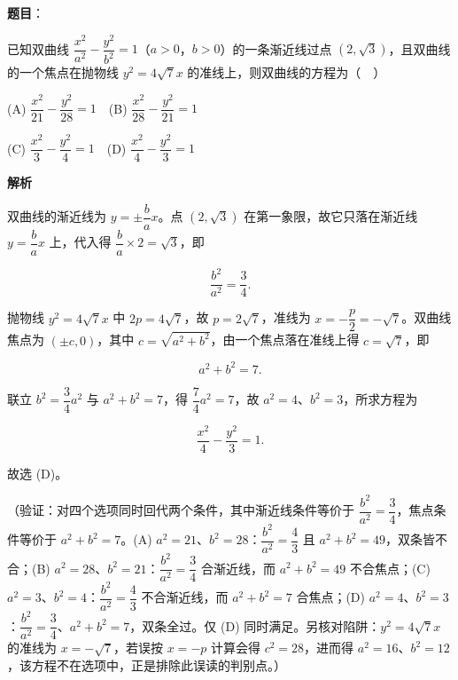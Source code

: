 \begin{answer}

\textbf{题目}：

已知双曲线 \(\dfrac{x^2}{a^2}-\dfrac{y^2}{b^2}=1\)（\(a>0\)，\(b>0\)）的一条渐近线过点 \((2,\sqrt{3})\)，且双曲线的一个焦点在抛物线 \(y^2=4\sqrt{7}x\) 的准线上，则双曲线的方程为（　）

(A) \(\dfrac{x^2}{21}-\dfrac{y^2}{28}=1\)　(B) \(\dfrac{x^2}{28}-\dfrac{y^2}{21}=1\)

(C) \(\dfrac{x^2}{3}-\dfrac{y^2}{4}=1\)　(D) \(\dfrac{x^2}{4}-\dfrac{y^2}{3}=1\)

\textbf{解析}

双曲线的渐近线为 \(y=\pm\dfrac{b}{a}x\)。点 \((2,\sqrt{3})\) 在第一象限，故它只落在渐近线 \(y=\dfrac{b}{a}x\) 上，代入得 \(\dfrac{b}{a}\times 2=\sqrt{3}\)，即

\nopagebreak[4]
\[
\dfrac{b^2}{a^2}=\dfrac{3}{4}.
\]

抛物线 \(y^2=4\sqrt{7}x\) 中 \(2p=4\sqrt{7}\)，故 \(p=2\sqrt{7}\)，准线为 \(x=-\dfrac{p}{2}=-\sqrt{7}\)。双曲线焦点为 \((\pm c,0)\)，其中 \(c=\sqrt{a^2+b^2}\)，由一个焦点落在准线上得 \(c=\sqrt{7}\)，即

\nopagebreak[4]
\[
a^2+b^2=7.
\]

联立 \(b^2=\dfrac{3}{4}a^2\) 与 \(a^2+b^2=7\)，得 \(\dfrac{7}{4}a^2=7\)，故 \(a^2=4\)、\(b^2=3\)，所求方程为

\nopagebreak[4]
\[
\dfrac{x^2}{4}-\dfrac{y^2}{3}=1.
\]

故选 (D)。

（验证：对四个选项同时回代两个条件，其中渐近线条件等价于 \(\dfrac{b^2}{a^2}=\dfrac{3}{4}\)，焦点条件等价于 \(a^2+b^2=7\)。(A) \(a^2=21\)、\(b^2=28\)：\(\dfrac{b^2}{a^2}=\dfrac{4}{3}\) 且 \(a^2+b^2=49\)，双条皆不合；(B) \(a^2=28\)、\(b^2=21\)：\(\dfrac{b^2}{a^2}=\dfrac{3}{4}\) 合渐近线，而 \(a^2+b^2=49\) 不合焦点；(C) \(a^2=3\)、\(b^2=4\)：\(\dfrac{b^2}{a^2}=\dfrac{4}{3}\) 不合渐近线，而 \(a^2+b^2=7\) 合焦点；(D) \(a^2=4\)、\(b^2=3\)：\(\dfrac{b^2}{a^2}=\dfrac{3}{4}\)、\(a^2+b^2=7\)，双条全过。仅 (D) 同时满足。另核对陷阱：\(y^2=4\sqrt{7}x\) 的准线为 \(x=-\sqrt{7}\)，若误按 \(x=-p\) 计算会得 \(c^2=28\)，进而得 \(a^2=16\)、\(b^2=12\)，该方程不在选项中，正是排除此误读的判别点。）


\end{answer}
